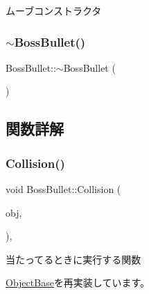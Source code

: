 ムーブコンストラクタ 

\mbox{\label{class_boss_bullet_a387327aee4bbfba8abd6320f6f5acb35}} 
\subsubsection{\texorpdfstring{$\sim$\+Boss\+Bullet()}{~BossBullet()}}
{\footnotesize\ttfamily Boss\+Bullet\+::$\sim$\+Boss\+Bullet (\begin{DoxyParamCaption}{ }\end{DoxyParamCaption})\hspace{0.3cm}{\ttfamily [inline]}}



\subsection{関数詳解}
\mbox{\label{class_boss_bullet_ab742fa1d233e0df5d49cc239e24eeec3}} 
\subsubsection{\texorpdfstring{Collision()}{Collision()}}
{\footnotesize\ttfamily void Boss\+Bullet\+::\+Collision (\begin{DoxyParamCaption}\item[{\mbox{\hyperlink{class_object_base}{Object\+Base}} $\ast$}]{obj,  }\item[{\mbox{\hyperlink{common_8h_ae148fff5818e9444b4ab2288829559bf}{Vec2}}}]{ }\end{DoxyParamCaption})\hspace{0.3cm}{\ttfamily [final]}, {\ttfamily [virtual]}}



当たってるときに実行する関数 



\mbox{\hyperlink{class_object_base_a3e1db79dfa119be067d816c22d09839d}{Object\+Base}}を再実装しています。

\mbox{\label{class_boss_bullet_ace134e26eed55f3a839b8c6412664234}} 
